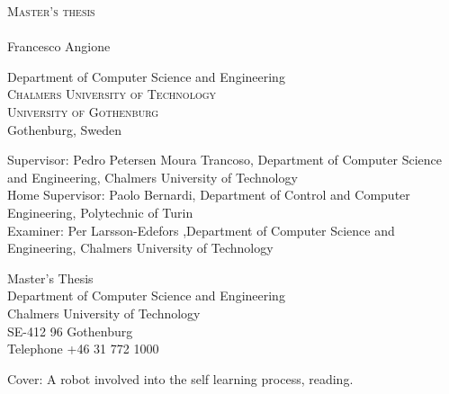 \newpage
\restoregeometry
\thispagestyle{empty}
\mbox{}


\newpage
\thispagestyle{empty}
\begin{center}
	\textsc{\large Master's thesis \the\year}\\[4cm]		%
	\textbf{\Large \multiLineTitle{0.2cm}} \\[1cm]
	{\large Francesco Angione}
	
	\vfill	
	\begin{figure}[H]
	\centering
	\end{figure}	\vspace{5mm}	
	
	Department of Computer Science and Engineering\\
	\textsc{Chalmers University of Technology} \\
	\textsc{University of Gothenburg} \\
	Gothenburg, Sweden \the\year \\
\end{center}


\newpage
\thispagestyle{empty}
\vspace*{4.5cm}


Supervisor: Pedro Petersen Moura Trancoso, Department of Computer Science and Engineering, Chalmers University of Technology \\
Home Supervisor: Paolo Bernardi,  Department of Control and Computer Engineering, Polytechnic of Turin \\
Examiner: Per Larsson-Edefors ,Department of Computer Science and Engineering, Chalmers University of Technology  \setlength{\parskip}{1cm}

Master's Thesis \the\year\\	%
Department of Computer Science and Engineering\\
Chalmers University of Technology\\
SE-412 96 Gothenburg\\
Telephone +46 31 772 1000 \setlength{\parskip}{0.5cm}

\vfill
Cover: A robot involved into the self learning process, reading.



